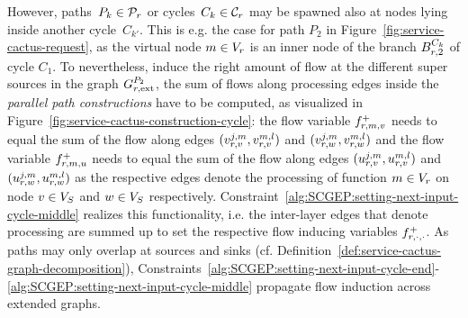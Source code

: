 \documentclass[10pt, conference, letterpaper]{IEEEtran}
\begin{document}
However, paths~$P_k \in \Paths$ or cycles~$C_k \in \Cycles$ may be spawned also at nodes lying inside another cycle~$C_{k'}$. This is e.g. the case for path $P_2$ in Figure~\ref{fig:service-cactus-request}, as the virtual node $m \in V_{r}$ is an inner node of the branch $\VEcycleBranchL$ of cycle $C_1$. To nevertheless, induce the right amount of flow at the different super sources in the graph $\VGextpath[\req][2]$, the sum of flows along processing edges inside the \emph{parallel path constructions} have to be computed, as visualized in Figure~\ref{fig:service-cactus-construction-cycle}: the flow variable $f^+_{r,m,v}$ needs to equal the sum of the flow along edges $(v^{j,m}_{r,v},v^{m,l}_{r,v})$ and $(v^{j,m}_{r,w},v^{m,l}_{r,w})$ and the flow variable $f^+_{r,m,u}$ needs to equal the sum of the flow along edges $(u^{j,m}_{r,v},u^{m,l}_{r,v})$ and $(u^{j,m}_{r,w},u^{m,l}_{r,w})$ as the respective edges denote the processing of function $m \in V_{r}$ on node $v \in V_S$ and $w \in V_S$ respectively. Constraint~\ref{alg:SCGEP:setting-next-input-cycle-middle} realizes this functionality, i.e. the inter-layer edges that denote processing are summed up to set the respective flow inducing variables $f^+_{r,\cdot,\cdot}$. As paths may only overlap at sources and sinks (cf. Definition~\ref{def:service-cactus-graph-decomposition}), Constraints~\ref{alg:SCGEP:setting-next-input-cycle-end}-\ref{alg:SCGEP:setting-next-input-cycle-middle} propagate flow induction across extended graphs.
\end{document}
